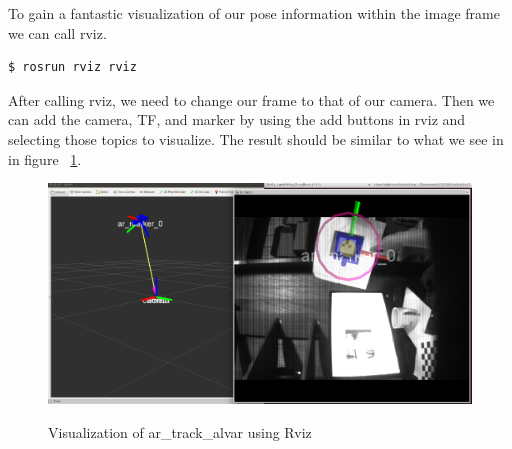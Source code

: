 \begin{itemize}
To gain a fantastic visualization of our pose information within the image frame we can call rviz.
\begin{lstlisting}[language=bash]
$ rosrun rviz rviz
\end{lstlisting}
After calling rviz, we need to change our frame to that of our camera. Then we can add the camera, TF, and marker by using the add buttons in rviz and selecting those topics to visualize. The result should be similar to what we see in in figure ~\ref{tracker}.\\
\begin{figure}[h]
\caption{Visualization of ar\_track\_alvar using Rviz}
\centering
\includegraphics[width=.75\textwidth]{images/tracker}
\label{tracker}
\end{figure} 


\end{itemize}
